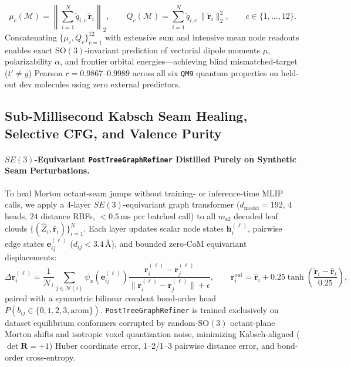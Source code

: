 \documentclass[11pt,a4paper]{article}
\begin{document}
\begin{enumerate}[leftmargin=1.6em,itemsep=2pt,topsep=2pt]
    \begin{equation}
    \label{eq:multipole}
    \mu_c(\mathcal{M}) = \left\| \sum_{i=1}^N \tilde{q}_{i,c}\, \tilde{\mathbf{r}}_i \right\|_2, \qquad
    Q_c(\mathcal{M}) = \sum_{i=1}^N \tilde{q}_{i,c}\, \|\tilde{\mathbf{r}}_i\|_2^2, \qquad c \in \{1,\dots,12\}.
    \end{equation}
    Concatenating $\{\mu_c, Q_c\}_{c=1}^{12}$ with extensive sum and intensive mean node readouts enables exact $\text{SO}(3)$-invariant prediction of vectorial dipole moments $\mu$, polarizability $\alpha$, and frontier orbital energies---achieving blind mismatched-target ($t' \ne y$) Pearson $r = 0.9867\text{--}0.9989$ across all six \texttt{QM9} quantum properties on held-out dev molecules using zero external predictors.
\end{enumerate}

\subsection{Sub-Millisecond Kabsch Seam Healing, Selective CFG, and Valence Purity}
\label{sec:refiner}

\paragraph{$SE(3)$-Equivariant \texttt{PostTreeGraphRefiner} Distilled Purely on Synthetic Seam Perturbations.}
To heal Morton octant-seam jumps without training- or inference-time MLIP calls, we apply a $4$-layer $SE(3)$-equivariant graph transformer ($d_{\text{model}} = 192$, $4$ heads, $24$ distance RBFs, $<0.5\,\text{ms}$ per batched call) to all $m_{\text{s2}}$ decoded leaf clouds $\{(\hat{Z}_i, \hat{\mathbf{r}}_i)\}_{i=1}^N$. Each layer updates scalar node states $\mathbf{h}_i^{(\ell)}$, pairwise edge states $\mathbf{e}_{ij}^{(\ell)}$ ($d_{ij} < 3.4\,\text{\AA}$), and bounded zero-CoM equivariant displacements:
\begin{equation}
\label{eq:refiner}
\Delta \mathbf{r}_i^{(\ell)} = \frac{1}{\mathcal{N}_i} \sum_{j \in \mathcal{N}(i)} \psi_x\!\left(\mathbf{e}_{ij}^{(\ell)}\right) \frac{\mathbf{r}_i^{(\ell)} - \mathbf{r}_j^{(\ell)}}{\|\mathbf{r}_i^{(\ell)} - \mathbf{r}_j^{(\ell)}\| + \epsilon}, \qquad
\mathbf{r}_i^{\text{out}} = \hat{\mathbf{r}}_i + 0.25 \tanh\!\left(\frac{\tilde{\mathbf{r}}_i - \hat{\mathbf{r}}_i}{0.25}\right),
\end{equation}
paired with a symmetric bilinear covalent bond-order head $P(b_{ij} \in \{0, 1, 2, 3, \text{arom}\})$. \texttt{PostTree\allowbreak Graph\allowbreak Refiner} is trained exclusively on dataset equilibrium conformers corrupted by random-$\text{SO}(3)$ octant-plane Morton shifts and isotropic voxel quantization noise, minimizing Kabsch-aligned ($\det \mathbf{R} = +1$) Huber coordinate error, 1--2/1--3 pairwise distance error, and bond-order cross-entropy.
\end{document}
